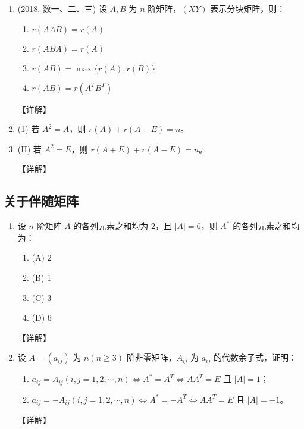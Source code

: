 \documentclass[12pt, a4paper, oneside, UTF8]{ctexbook}
\begin{document}
\begin{enumerate}[label=\arabic*.,start=6]
    \item (2018, 数一、二、三) 设 $ A, B $ 为 $ n $ 阶矩阵，$ (XY) $ 表示分块矩阵，则：
    \begin{enumerate}
        \item $ r(A A B) = r(A) $
        \item $ r(A B A) = r(A) $
        \item $ r(A B) = \max\{r(A), r(B)\} $
        \item $ r(A B) = r(A^T B^T) $
    \end{enumerate}
    
    \begin{solution}
    【详解】
    \end{solution}
    
    \item (1) 若 $ A^2 = A $，则 $ r(A) + r(A - E) = n $。
    \item (II) 若 $ A^2 = E $，则 $ r(A + E) + r(A - E) = n $。
    
    \begin{solution}
    【详解】
    \end{solution}
\end{enumerate}

\subsection{关于伴随矩阵}

\begin{enumerate}[label=\arabic*.,start=8]
    \item 设 $ n $ 阶矩阵 $ A $ 的各列元素之和均为 2，且 $ |A| = 6 $，则 $ A^* $ 的各列元素之和均为：
    \begin{enumerate}
        \item (A) 2
        \item (B) 1
        \item (C) 3
        \item (D) 6
    \end{enumerate}
    
    \begin{solution}
    【详解】
    \end{solution}
    
    \item 设 $ A = (a_{ij}) $ 为 $ n(n \geq 3) $ 阶非零矩阵，$ A_{ij} $ 为 $ a_{ij} $ 的代数余子式，证明：
    \begin{enumerate}
        \item $ a_{ij} = A_{ij}(i, j = 1, 2, \cdots, n) \Leftrightarrow A^* = A^T \Leftrightarrow AA^T = E $ 且 $ |A| = 1 $；
        \item $ a_{ij} = -A_{ij}(i, j = 1, 2, \cdots, n) \Leftrightarrow A^* = -A^T \Leftrightarrow AA^T = E $ 且 $ |A| = -1 $。
    \end{enumerate}
    
    \begin{solution}
    【详解】
    \end{solution}
\end{enumerate}
\end{document}
